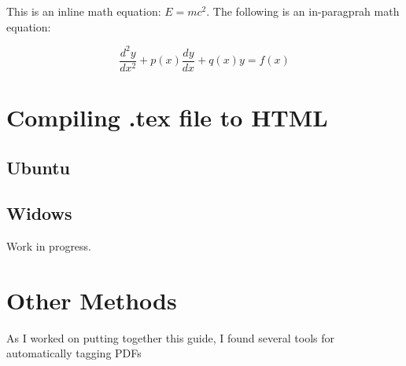 \documentclass{llncs}
\begin{document}
This is an inline math equation: $E=mc^2$. The following is an in-paragprah math
equation:

\begin{equation}
  \frac{d^2y}{dx^2} + p(x) \frac{dy}{dx} + q(x)y = f(x)
\end{equation}



\section{Compiling .tex file to HTML}
\label{sec:Compiling .tex file to HTML}

\subsection{Ubuntu}


\subsection{Widows}

Work in progress.


\section{Other Methods}

As I worked on putting together this guide, I found several tools for
automatically tagging PDFs







\end{document}
